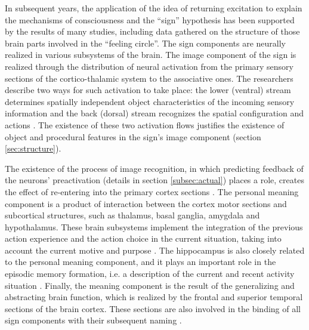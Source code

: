 \documentclass[review]{elsarticle}
\begin{document}
In subsequent years, the application of the idea of returning excitation to explain the mechanisms of consciousness and the ``sign'' hypothesis has been supported by the results of many studies, including data gathered on the structure of those brain parts involved in the ``feeling circle''. The sign components are neurally realized in various subsystems of the brain. The image component of the sign is realized through the distribution of neural activation from the primary sensory sections of the cortico-thalamic system to the associative ones. The researchers describe two ways for such activation to take place: the lower (ventral) stream determines spatially independent object characteristics of the incoming sensory information and the back (dorsal) stream recognizes the spatial configuration and actions \cite{Grossberg2014}. The existence of these two activation flows justifies the existence of object and procedural features in the sign's image component (section \ref{sec:structure}).

The existence of the process of image recognition, in which predicting feedback of the neurons’ preactivation (details in section \ref{subsec:actual}) places a role, creates the effect of re-entering into the primary cortex sections \cite{Edelmen1981,Ivanitsky1996}. The personal meaning component is a product of interaction between the cortex motor sections and subcortical structures, such as thalamus, basal ganglia, amygdala and hypothalamus. These brain subsystems implement the integration of the previous action experience and the action choice in the current situation, taking into account the current motive and purpose \cite{Gurney2001}. The hippocampus is also closely related to the personal meaning component, and it plays an important role in the episodic memory formation, i.e. a description of the current and recent activity situation \cite{Rolls2010}. Finally, the meaning component is the result of the generalizing and abstracting brain function, which is realized by the frontal and superior temporal sections of the brain cortex. These sections are also involved in the binding of all sign components with their subsequent naming \cite{Friederici2015,Pulvermuller2013}.
\end{document}
